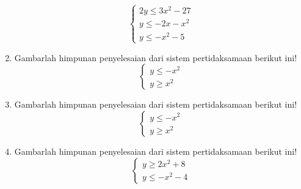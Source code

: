 \documentclass[fleqn, a4paper, 12pt]{article} %
\begin{document}
\begin{enumerate}
			\[\left\{\begin{array}{l}
				2y \leq 3x^2 - 27 \\
				y \leq -2x - x^2 \\
				y \leq -x^2 - 5
			\end{array}\right.\]
		\item Gambarlah himpunan penyelesaian dari sistem pertidaksamaan berikut ini!
			\[\left\{\begin{array}{l}
				y \leq -x^2 \\
				y \geq x^2
			\end{array}\right.\]
		\item Gambarlah himpunan penyelesaian dari sistem pertidaksamaan berikut ini!
			\[\left\{\begin{array}{l}
				y \leq -x^2 \\
				y \geq x^2
			\end{array}\right.\]
		\item Gambarlah himpunan penyelesaian dari sistem pertidaksamaan berikut ini!
			\[\left\{\begin{array}{l}
				y \geq 2x^2 + 8 \\
				y \leq -x^2 - 4
			\end{array}\right.\]
	\end{enumerate}
\end{document}
